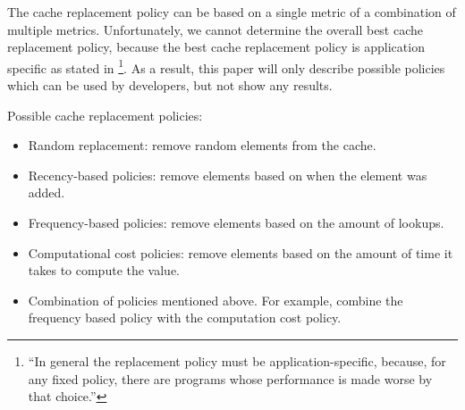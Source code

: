 The cache replacement policy can be based on a single metric of a combination of multiple metrics. Unfortunately, we cannot determine the overall best cache replacement policy, because the best cache replacement policy is application specific as stated in \footnote{``In general the replacement policy must be application-specific, because, for any fixed policy, there are programs whose performance is made worse by that choice.''\cite{acar2003selective}}. As a result, this paper will only describe possible policies which can be used by developers, but not show any results.


Possible cache replacement policies:
\begin{itemize}
  \item Random replacement: remove random elements from the cache.
  \item Recency-based policies: remove elements based on when the element was added.
  \item Frequency-based policies: remove elements based on the amount of lookups.
  \item Computational cost policies: remove elements based on the amount of time it takes to compute the value.
  \item Combination of policies mentioned above. For example, combine the frequency based policy with the computation cost policy.
\end{itemize}